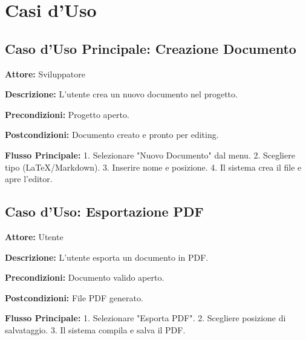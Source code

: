 \section{Casi d'Uso}

\subsection{Caso d'Uso Principale: Creazione Documento}

\textbf{Attore:} Sviluppatore

\textbf{Descrizione:} L'utente crea un nuovo documento nel progetto.

\textbf{Precondizioni:} Progetto aperto.

\textbf{Postcondizioni:} Documento creato e pronto per editing.

\textbf{Flusso Principale:}
1. Selezionare "Nuovo Documento" dal menu.
2. Scegliere tipo (LaTeX/Markdown).
3. Inserire nome e posizione.
4. Il sistema crea il file e apre l'editor.

\subsection{Caso d'Uso: Esportazione PDF}

\textbf{Attore:} Utente

\textbf{Descrizione:} L'utente esporta un documento in PDF.

\textbf{Precondizioni:} Documento valido aperto.

\textbf{Postcondizioni:} File PDF generato.

\textbf{Flusso Principale:}
1. Selezionare "Esporta PDF".
2. Scegliere posizione di salvataggio.
3. Il sistema compila e salva il PDF.